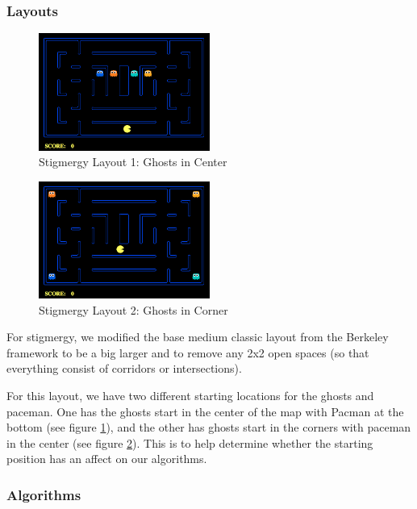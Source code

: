\documentclass[11pt]{article}
\begin{document}
\subsubsection{Layouts}
\begin{figure}[H]
	\includegraphics[width=0.5\textwidth]{StigmergyClassic1.png}
	\caption{Stigmergy Layout 1: Ghosts in Center}
	\label{fig:stigmap1}
\end{figure}
\begin{figure}[H]
	\includegraphics[width=0.5\textwidth]{StigmergyClassic2.png}
	\caption{Stigmergy Layout 2: Ghosts in Corner}
	\label{fig:stigmap2}
\end{figure}
For stigmergy, we modified the base medium classic layout from the Berkeley framework to be a big larger and to remove any 2x2 open spaces (so that everything consist of corridors or intersections).   

For this layout, we have two different starting locations for the ghosts and paceman.  One has the ghosts start in the center of the map with Pacman at the bottom (see figure \ref{fig:stigmap1}), and the other has ghosts start in the corners with paceman in the center (see figure \ref{fig:stigmap2}).  This is to help determine whether the starting position has an affect on our algorithms.

\subsubsection{Algorithms}
\end{document}
